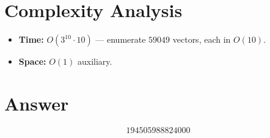 \documentclass[12pt]{article}
\begin{document}
\section{Complexity Analysis}
\begin{itemize}
\item \textbf{Time:} $O(3^{10}\cdot 10)$ --- enumerate $59049$ vectors, each in $O(10)$.
\item \textbf{Space:} $O(1)$ auxiliary.
\end{itemize}

\section{Answer}

\[
\boxed{194505988824000}
\]
\end{document}

